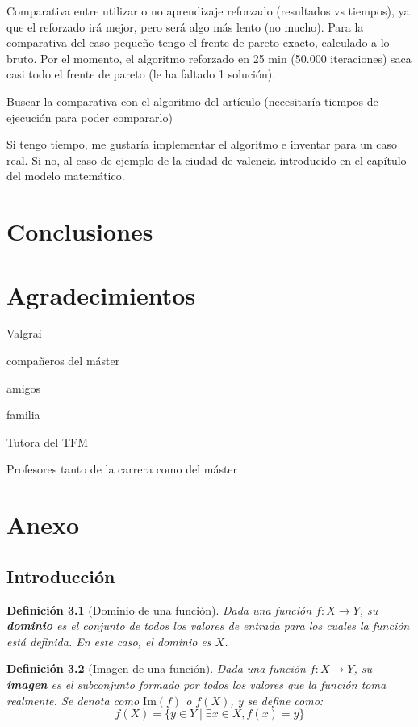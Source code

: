 \documentclass[12pt,a4paper]{book}
\newtheorem{defi}{Definición}[section]
\begin{document}
Comparativa entre utilizar o no aprendizaje reforzado (resultados vs tiempos), ya que el reforzado irá mejor, pero será algo más lento (no mucho).
Para la comparativa del caso pequeño tengo el frente de pareto exacto, calculado a lo bruto. Por el momento, el algoritmo reforzado en 25 min (50.000 iteraciones) saca casi todo el frente de pareto (le ha faltado 1 solución).

Buscar la comparativa con el algoritmo del artículo (necesitaría tiempos de ejecución para poder compararlo)

Si tengo tiempo, me gustaría implementar el algoritmo e inventar para un caso real. Si no, al caso de ejemplo de la ciudad de valencia introducido en el capítulo del modelo matemático.

\chapter{Conclusiones}


\chapter{Agradecimientos}
Valgrai

compañeros del máster

amigos

familia

Tutora del TFM

Profesores tanto de la carrera como del máster 

\chapter{Anexo}
\section{Introducción}
\begin{defi}[Dominio de una función]
Dada una función $f: X \to Y$, su \textbf{dominio} es el conjunto de todos los valores de entrada para los cuales la función está definida. En este caso, el dominio es $X$.
\end{defi}

\begin{defi}[Imagen de una función]
Dada una función $f: X \to Y$, su \textbf{imagen} es el subconjunto formado por todos los valores que la función toma realmente. Se denota como $\text{Im}(f)$ o $f(X)$, y se define como:
$$ f(X) = \{y \in Y \mid \exists x \in X, f(x) = y \} $$
\end{defi}
\end{document}
